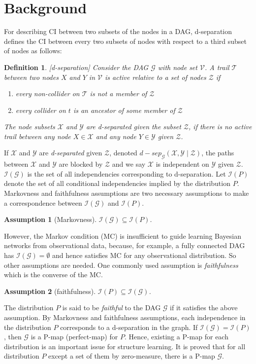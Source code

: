 \documentclass{article}
\newtheorem{definition}{Definition}
\newtheorem{assumption}{Assumption}
\newcommand{\I}{\mathcal{I}}
\newcommand{\Y}{\mathcal{Y}}
\newcommand{\Z}{\mathcal{Z}}
\newcommand{\X}{\mathcal{X}}
\newcommand{\V}{\mathcal{V}}
\newcommand{\T}{\mathcal{T}}
\newcommand{\G}{\mathcal{G}}
\begin{document}
\section{Background}
For describing CI between two subsets of the nodes in a DAG, d-separation defines the CI between every two subsets of nodes with respect to a third subset of nodes as follows:
\begin{definition} \cite{koller}[d-separation] \label{definition_d-separation}
    Consider the DAG $\G$ with node set $\V$.
    A trail $\T$ between two nodes $X$ and $Y$ in $\V$ is \emph{active} relative to a set of nodes $\Z$ if 
    \begin{enumerate}
    	\item every non-collider on $\T$ is not a member of $\Z$
    	\item every collider on $t$ is an ancestor of some member of $\Z$
    \end{enumerate}
    The node subsets $\X$ and $\Y$ are \emph{d-separated} given the subset $\Z$, if there is no active
    trail between any node $X \in \X$ and any node $Y \in \Y$ given $\Z$.

\end{definition}
If $\X$ and $\Y$ are \emph{d-separated} given $\Z$, denoted $d-sep_{\G}(\X,\Y \mid \Z )$, the paths between $\X$ and $\Y$ are blocked by $\Z$ and we say $\X$ is independent on $\Y$ given $\Z$. $\I (\G)$ is the set of all independencies corresponding to d-separation.
Let $\I(P)$ denote the set of all conditional independencies implied by the distribution $P$.
Markovness and faithfulness assumptions are two necessary assumptions to make a correspondence between $\I (\G)$ and $\I (P)$.
\begin{assumption}[Markovness] \label{assumption_Markovness}
    $\I(\G)\subseteq \I(P)$.
\end{assumption}
However, the Markov condition (MC) is insufficient to guide learning Bayesian networks from observational data, because, for example, a fully connected DAG has $\I(\G)=\emptyset$ and hence satisfies MC for any observational distribution.
So other assumptions are needed. 
One commonly used assumption is \emph{faithfulness} which is the converse of the MC. 
\begin{assumption}[faithfulness] \label{assumption_faithfulness}
    $\mathcal{I}(P) \subseteq \mathcal{I}(\mathcal{G})$.
\end{assumption}
The distribution $P$ is said to be \emph{ faithful} to the DAG $\G$ if it satisfies the above assumption.
By Markovness and faithfulness assumptions, each independence in the distribution $P$ corresponds to a d-separation in the graph.
If $\I(\G) = \I(P)$, then $\G$ is a P-map (perfect-map) for $P$.
Hence, existing a P-map for each distribution is an important issue for structure learning.
It is proved that for all distribution $P$ except a set of them by zero-measure, there is a P-map $\G$.
\end{document}
